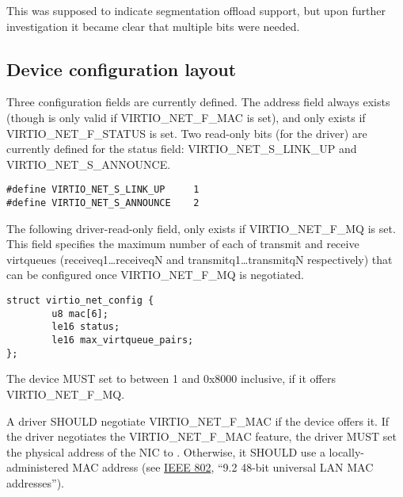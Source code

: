 This was supposed to indicate segmentation offload support, but
upon further investigation it became clear that multiple bits
were needed.

\subsection{Device configuration layout}\label{sec:Device Types / Network Device / Device configuration layout}

Three configuration fields are currently defined. The  address field
always exists (though is only valid if VIRTIO_NET_F_MAC is set), and
 only exists if VIRTIO_NET_F_STATUS is set. Two
read-only bits (for the driver) are currently defined for the status field:
VIRTIO_NET_S_LINK_UP and VIRTIO_NET_S_ANNOUNCE.

\begin{lstlisting}
#define VIRTIO_NET_S_LINK_UP     1
#define VIRTIO_NET_S_ANNOUNCE    2
\end{lstlisting}

The following driver-read-only field,  only exists if
VIRTIO_NET_F_MQ is set. This field specifies the maximum number
of each of transmit and receive virtqueues (receiveq1\ldots receiveqN
and transmitq1\ldots transmitqN respectively) that can be configured once VIRTIO_NET_F_MQ
is negotiated.

\begin{lstlisting}
struct virtio_net_config {
        u8 mac[6];
        le16 status;
        le16 max_virtqueue_pairs;
};
\end{lstlisting}


The device MUST set  to between 1 and 0x8000 inclusive,
if it offers VIRTIO_NET_F_MQ.


A driver SHOULD negotiate VIRTIO_NET_F_MAC if the device offers it.
If the driver negotiates the VIRTIO_NET_F_MAC feature, the driver MUST set
the physical address of the NIC to .  Otherwise, it SHOULD
use a locally-administered MAC address (see \hyperref[intro:IEEE 802]{IEEE 802},
``9.2 48-bit universal LAN MAC addresses'').

